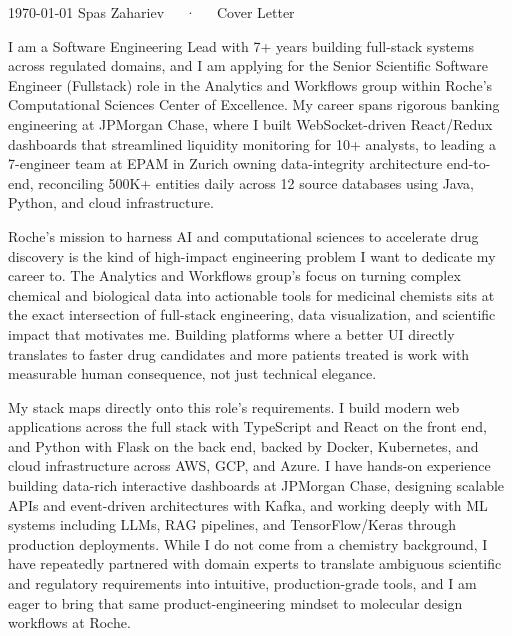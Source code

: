 \documentclass[11pt, a4paper]{awesome-cv}
\begin{document}
\makecvheader[R]

\makecvfooter
  {\today}
  {Spas Zahariev~~~·~~~Cover Letter}
  {}

\makelettertitle

\begin{cvletter}

I am a Software Engineering Lead with 7+ years building full-stack systems across regulated domains, and I am applying for the Senior Scientific Software Engineer (Fullstack) role in the Analytics and Workflows group within Roche's Computational Sciences Center of Excellence. My career spans rigorous banking engineering at JPMorgan Chase, where I built WebSocket-driven React/Redux dashboards that streamlined liquidity monitoring for 10+ analysts, to leading a 7-engineer team at EPAM in Zurich owning data-integrity architecture end-to-end, reconciling 500K+ entities daily across 12 source databases using Java, Python, and cloud infrastructure.

Roche's mission to harness AI and computational sciences to accelerate drug discovery is the kind of high-impact engineering problem I want to dedicate my career to. The Analytics and Workflows group's focus on turning complex chemical and biological data into actionable tools for medicinal chemists sits at the exact intersection of full-stack engineering, data visualization, and scientific impact that motivates me. Building platforms where a better UI directly translates to faster drug candidates and more patients treated is work with measurable human consequence, not just technical elegance.

My stack maps directly onto this role's requirements. I build modern web applications across the full stack with TypeScript and React on the front end, and Python with Flask on the back end, backed by Docker, Kubernetes, and cloud infrastructure across AWS, GCP, and Azure. I have hands-on experience building data-rich interactive dashboards at JPMorgan Chase, designing scalable APIs and event-driven architectures with Kafka, and working deeply with ML systems including LLMs, RAG pipelines, and TensorFlow/Keras through production deployments. While I do not come from a chemistry background, I have repeatedly partnered with domain experts to translate ambiguous scientific and regulatory requirements into intuitive, production-grade tools, and I am eager to bring that same product-engineering mindset to molecular design workflows at Roche.

\end{cvletter}


\makeletterclosing
\end{document}
